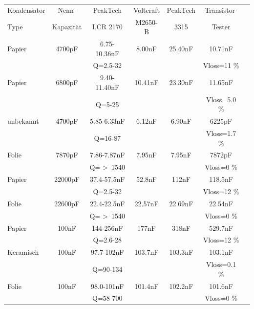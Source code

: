 \begin{tabular}{| l | c | c | c | c | c | c |}
   \hline
Kondensator & Nenn-      & PeakTech     & Voltcraft & PeakTech & Transistor- \\
Type        & Kapazität  & LCR 2170     & M2650-B   &  3315    & Tester      \\
    \hline
    \hline
Papier     & 4700pF      & 6.75-10.36nF & 8.00nF    &  25.40nF &  10.71nF   \\
           &             &  Q=2.5-32    &           &          &  Vloss=11 \% \\
    \hline
Papier     & 6800pF      & 9.40-11.40nF & 10.41nF   &  23.30nF &  11.65nF  \\
           &             &  Q=5-25      &           &          &  Vloss=5.0 \% \\
    \hline
unbekannt  & 4700pF      & 5.85-6.33nF  & 6.12nF    &  6.90nF  &  6225pF  \\
           &             &  Q=16-87     &           &          &  Vloss=1.7 \% \\
    \hline
Folie      & 7870pF      & 7.86-7.87nF  & 7.95nF    &  7.95nF  &  7872pF  \\
           &             &  Q= \textgreater~1540    &           &          &  Vloss=0 \% \\
    \hline
Papier     & 22000pF     & 37.4-57.5nF  & 52.8nF    &  112nF   &  118.5nF \\
           &             &  Q=2.5-32    &           &          &  Vloss=12 \% \\
    \hline
Folie      & 22600pF     & 22.4-22.5nF  & 22.57nF   & 22.69nF  &  22.54nF \\
           &             & Q= \textgreater~1540     &           &          &  Vloss=0 \% \\
    \hline
Papier     & 100nF       & 144-256nF    & 177nF     &  318nF   &  529.7nF \\
           &             & Q=2.6-28     &           &          &  Vloss=12 \% \\
    \hline
Keramisch  & 100nF       & 97.7-102nF   & 103.7nF   & 103.3nF  &  103.1nF \\
           &             & Q=90-134     &           &          &  Vloss=0.1 \% \\
    \hline
Folie      & 100nF       & 98.0-101nF   & 101.4nF   & 102.2nF  &  101.6nF \\
           &             & Q=58-700     &           &          &  Vloss=0 \% \\
    \hline
\end{tabular}
\vspace{0.5 cm}


